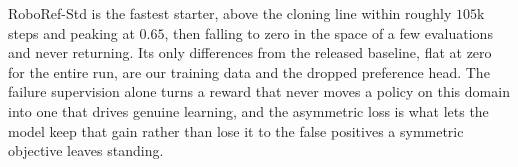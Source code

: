RoboRef-Std is the fastest starter, above the cloning line within roughly $105$k
steps and peaking at $0.65$, then falling to zero in the space of a few
evaluations and never returning. Its only differences from the released baseline,
flat at zero for the entire run, are our training data and the dropped preference
head. The failure supervision alone turns a reward that never moves a policy on
this domain into one that drives genuine learning, and the asymmetric loss is
what lets the model keep that gain rather than lose it to the false positives a
symmetric objective leaves standing.

%
%

